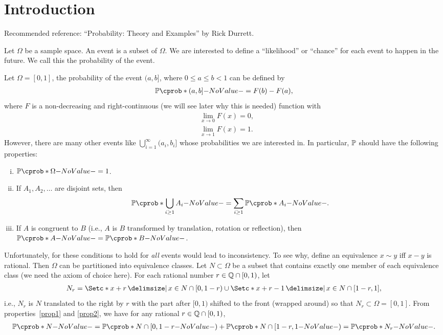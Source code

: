\documentclass[12pt]{article}
\begin{document}


\section{Introduction}

Recommended reference: ``Probability: Theory and Examples'' by Rick Durrett.

Let $\Omega$ be a sample space. An event is a subset of $\Omega$. We are interested to define a ``likelihood'' or ``chance'' for each event to happen in the future. We call this the probability of the event.
 
\begin{Example}\label{wk3:example1}
Let $\Omega = [0,1]$, the probability of the event $(a, b]$, where $0\leq a \leq b < 1$ can be defined by
\begin{align*}
\P({(a, b]}) = F(b) - F(a),
\end{align*}
where $F$ is a non-decreasing and right-continuous (we will see later why this is needed) function  with
\begin{align*}
&\lim_{x \to 0} F(x) = 0, \\
&\lim_{x \to 1} F(x) = 1.
\end{align*}
However, there are many other events like $\bigcup\limits_{i=1}^{\infty} (a_i,b_i]$ whose probabilities we are interested in. In particular, $\P$ should have the following properties:
\begin{enumerate}[(i)]
	\item\label{prop3} $\P(\Omega)=1$.
	\item\label{prop1} If $A_1, A_2, \ldots$ are disjoint sets, then
		\begin{align*}
		\P(\bigcup_{i\geq1} A_i) = \sum_{i\geq1} \P(A_i).
		\end{align*}
	\item\label{prop2} If $A$ is congruent to $B$ (i.e., $A$ is $B$ transformed by translation, rotation or reflection), then $\P(A)=\P(B)$.
\end{enumerate}
Unfortunately, for these conditions to hold for \emph{all} events would lead to inconsistency. To see why, define an equivalence $x \sim y$ iff $x - y$ is rational. Then $\Omega$ can be partitioned into equivalence classes. Let $N \subset \Omega$ be a subset that contains exactly one member of each equivalence class (we need the axiom of choice here). For each rational number $r \in \mathbb{Q}\cap [0,1)$, let
\begin{align*}
N_r = \set*{x+r \given x \in N\cap [0,1-r)} \cup \set*{x+r-1 \given x \in N\cap [1-r,1]},
\end{align*}
i.e., $N_r$ is $N$ translated to the right by $r$ with the part after $[0,1)$ shifted to the front (wrapped around) so that $N_r \subset \Omega=[0,1]$. From properties~\ref{prop1} and \ref{prop2}, we have for any rational $r \in\mathbb{Q}\cap [0,1)$,
\begin{align}\label{eq:N_r}
\P(N) = \P(N\cap [0,1-r)) + \P(N\cap [1-r,1)) = \P(N_r).
\end{align}


\end{Example}
\end{document}

